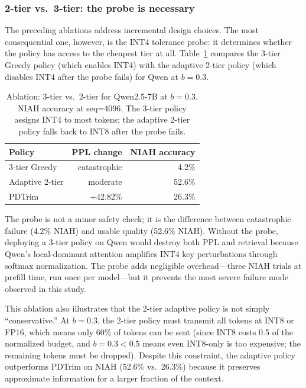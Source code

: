 \documentclass[11pt]{article}
\newcommand{\budget}{b}
\newcommand{\pct}{\%}
\theoremstyle{plain}
\theoremstyle{definition}
\begin{document}
\subsubsection{2-tier vs.\ 3-tier: the probe is necessary}
\label{sec:ablation-probe}

The preceding ablations address incremental design choices.  The most consequential one, however, is the INT4 tolerance probe: it determines whether the policy has access to the cheapest tier at all.  Table~\ref{tab:ablation-probe} compares the 3-tier Greedy policy (which enables INT4) with the adaptive 2-tier policy (which disables INT4 after the probe fails) for Qwen at $\budget=0.3$.

\begin{table}[t]
\centering
\caption{Ablation: 3-tier vs.\ 2-tier for Qwen2.5-7B at $\budget=0.3$.  NIAH accuracy at seq=4096.  The 3-tier policy assigns INT4 to most tokens; the adaptive 2-tier policy falls back to INT8 after the probe fails.}
\label{tab:ablation-probe}
\small
\begin{tabular}{lrr}
\toprule
Policy & PPL change & NIAH accuracy \\
\midrule
3-tier Greedy & catastrophic & 4.2\pct{} \\
Adaptive 2-tier & moderate & 52.6\pct{} \\
PDTrim & +42.82\pct{} & 26.3\pct{} \\
\bottomrule
\end{tabular}
\end{table}

The probe is not a minor safety check; it is the difference between catastrophic failure (4.2\pct{} NIAH) and usable quality (52.6\pct{} NIAH).  Without the probe, deploying a 3-tier policy on Qwen would destroy both PPL and retrieval because Qwen's local-dominant attention amplifies INT4 key perturbations through softmax normalization.  The probe adds negligible overhead---three NIAH trials at prefill time, run once per model---but it prevents the most severe failure mode observed in this study.

This ablation also illustrates that the 2-tier adaptive policy is not simply ``conservative.''  At $\budget=0.3$, the 2-tier policy must transmit all tokens at INT8 or FP16, which means only 60\pct{} of tokens can be sent (since INT8 costs 0.5 of the normalized budget, and $\budget=0.3 < 0.5$ means even INT8-only is too expensive; the remaining tokens must be dropped).  Despite this constraint, the adaptive policy outperforms PDTrim on NIAH (52.6\pct{} vs.\ 26.3\pct{}) because it preserves approximate information for a larger fraction of the context.
\end{document}

